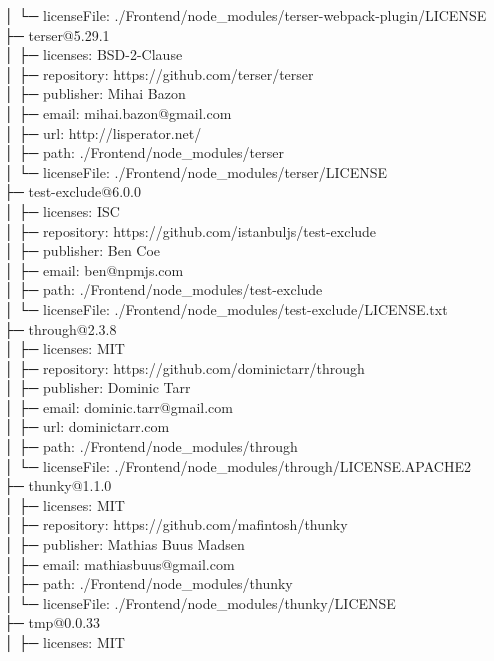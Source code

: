 │  └─ licenseFile: ./Frontend/node\_modules/terser-webpack-plugin/LICENSE\\
├─ terser@5.29.1\\
│  ├─ licenses: BSD-2-Clause\\
│  ├─ repository: https://github.com/terser/terser\\
│  ├─ publisher: Mihai Bazon\\
│  ├─ email: mihai.bazon@gmail.com\\
│  ├─ url: http://lisperator.net/\\
│  ├─ path: ./Frontend/node\_modules/terser\\
│  └─ licenseFile: ./Frontend/node\_modules/terser/LICENSE\\
├─ test-exclude@6.0.0\\
│  ├─ licenses: ISC\\
│  ├─ repository: https://github.com/istanbuljs/test-exclude\\
│  ├─ publisher: Ben Coe\\
│  ├─ email: ben@npmjs.com\\
│  ├─ path: ./Frontend/node\_modules/test-exclude\\
│  └─ licenseFile: ./Frontend/node\_modules/test-exclude/LICENSE.txt\\
├─ through@2.3.8\\
│  ├─ licenses: MIT\\
│  ├─ repository: https://github.com/dominictarr/through\\
│  ├─ publisher: Dominic Tarr\\
│  ├─ email: dominic.tarr@gmail.com\\
│  ├─ url: dominictarr.com\\
│  ├─ path: ./Frontend/node\_modules/through\\
│  └─ licenseFile: ./Frontend/node\_modules/through/LICENSE.APACHE2\\
├─ thunky@1.1.0\\
│  ├─ licenses: MIT\\
│  ├─ repository: https://github.com/mafintosh/thunky\\
│  ├─ publisher: Mathias Buus Madsen\\
│  ├─ email: mathiasbuus@gmail.com\\
│  ├─ path: ./Frontend/node\_modules/thunky\\
│  └─ licenseFile: ./Frontend/node\_modules/thunky/LICENSE\\
├─ tmp@0.0.33\\
│  ├─ licenses: MIT\\
